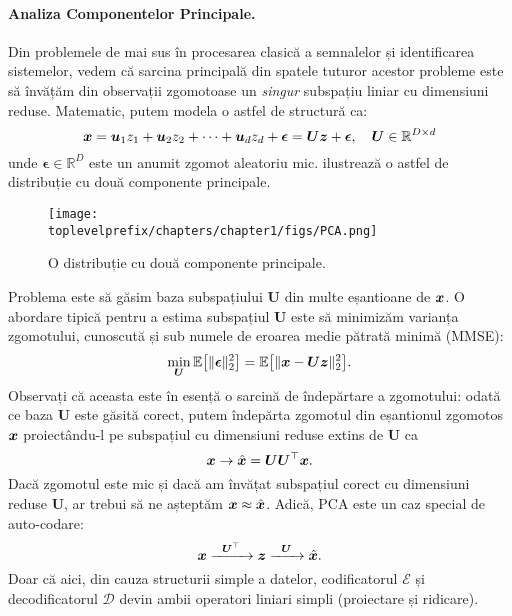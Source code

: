 \documentclass[../../book-main_ro.tex]{subfiles}
\begin{document}
\paragraph{Analiza Componentelor Principale.}
Din problemele de mai sus în procesarea clasică a semnalelor și identificarea sistemelor, vedem că sarcina principală din spatele tuturor acestor probleme este să învățăm din observații zgomotoase un {\em singur} subspațiu liniar cu dimensiuni reduse. Matematic, putem modela o astfel de structură ca:
\begin{equation}
    \bm{x} = \boldsymbol{u}_1 z_1 + \boldsymbol{u}_2 z_2 + \cdots + \boldsymbol{u}_d z_d + \boldsymbol{\epsilon} =  \boldsymbol{U} \bm{z} + \boldsymbol{\epsilon}, \quad \boldsymbol{U} \in \mathbb{R}^{D\times d}
    \label{eqn:PCA-model}
\end{equation}
unde $\boldsymbol{\epsilon} \in \mathbb{R}^D$ este un anumit zgomot aleatoriu mic.  ilustrează o astfel de distribuție cu două componente principale.
\begin{figure}
    \centering
    \texttt{[image: \\toplevelprefix/chapters/chapter1/figs/PCA.png]}
    \caption{O distribuție cu două componente principale.}
    \label{fig:PCA}
\end{figure}
Problema este să găsim baza subspațiului $\boldsymbol{U}$ din multe eșantioane de $\bm{x}$. O abordare tipică pentru a estima subspațiul $\boldsymbol{U}$ este să minimizăm varianța zgomotului, cunoscută și sub numele de eroarea medie pătrată minimă (MMSE):
\begin{equation}
    \min_{\boldsymbol{U}} \mathbb{E}\big[\|\boldsymbol{\epsilon}\|_2^2\big] = \mathbb{E}\big[\|\bm{x} - \boldsymbol{U} \bm{z}\|_2^2\big].
\end{equation}
Observați că aceasta este în esență o sarcină de îndepărtare a zgomotului: odată ce baza $\boldsymbol{U}$ este găsită corect, putem îndepărta zgomotul din eșantionul zgomotos $\bm{x}$ proiectându-l pe subspațiul cu dimensiuni reduse extins de $\boldsymbol{U}$ ca
\begin{equation}
\bm{x} \rightarrow \hat {\bm{x}} = \boldsymbol{U}\boldsymbol{U}^\top \bm{x}.
\end{equation}
Dacă zgomotul este mic și dacă am învățat subspațiul corect cu dimensiuni reduse $\boldsymbol{U}$, ar trebui să ne așteptăm $\bm{x} \approx \hat {\bm{x}}$. Adică, PCA este un caz special de auto-codare:
\begin{equation}
    \bm{x}   \xrightarrow{\hspace{2mm} \boldsymbol{U}^\top\hspace{2mm}} \bm{z}  \xrightarrow{\hspace{2mm} \boldsymbol{U} \hspace{2mm}} \hat {\bm{x}}.
       \label{eqn:auto-encoding-PCA}
\end{equation}
Doar că aici, din cauza structurii simple a datelor, codificatorul $\mathcal{E}$ și decodificatorul $\mathcal{D}$ devin ambii operatori liniari simpli (proiectare și ridicare).
\end{document}
